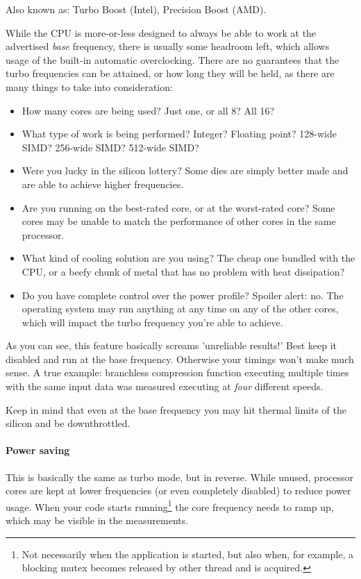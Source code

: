 \documentclass[hidelinks,titlepage,a4paper]{article}
\begin{document}
Also known as: Turbo Boost (Intel), Precision Boost (AMD).

While the CPU is more-or-less designed to always be able to work at the advertised \emph{base} frequency, there is usually some headroom left, which allows usage of the built-in automatic overclocking. There are no guarantees that the turbo frequencies can be attained, or how long they will be held, as there are many things to take into consideration:

\begin{itemize}
\item How many cores are being used? Just one, or all 8? All 16?
\item What type of work is being performed? Integer? Floating point? 128-wide SIMD? 256-wide SIMD? 512-wide SIMD?
\item Were you lucky in the silicon lottery? Some dies are simply better made and are able to achieve higher frequencies.
\item Are you running on the best-rated core, or at the worst-rated core? Some cores may be unable to match the performance of other cores in the same processor.
\item What kind of cooling solution are you using? The cheap one bundled with the CPU, or a beefy chunk of metal that has no problem with heat dissipation?
\item Do you have complete control over the power profile? Spoiler alert: no. The operating system may run anything at any time on any of the other cores, which will impact the turbo frequency you're able to achieve.
\end{itemize}

As you can see, this feature basically screams 'unreliable results!' Best keep it disabled and run at the base frequency. Otherwise your timings won't make much sense. A true example: branchless compression function executing multiple times with the same input data was measured executing at \emph{four} different speeds.

Keep in mind that even at the base frequency you may hit thermal limits of the silicon and be downthrottled.

\paragraph{Power saving}

This is basically the same as turbo mode, but in reverse. While unused, processor cores are kept at lower frequencies (or even completely disabled) to reduce power usage. When your code starts running\footnote{Not necessarily when the application is started, but also when, for example, a blocking mutex becomes released by other thread and is acquired.} the core frequency needs to ramp up, which may be visible in the measurements.
\end{document}
